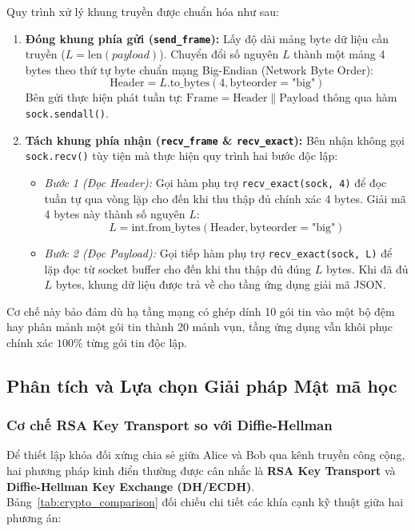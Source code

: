 \documentclass[a4paper,12pt]{article}
\begin{document}
Quy trình xử lý khung truyền được chuẩn hóa như sau:
\begin{enumerate}
    \item \textbf{Đóng khung phía gửi (\texttt{send\_frame}):} Lấy độ dài mảng byte dữ liệu cần truyền ($L = \text{len}(payload)$). Chuyển đổi số nguyên $L$ thành một mảng 4 bytes theo thứ tự byte chuẩn mạng Big-Endian (Network Byte Order):
    \begin{equation}
        \text{Header} = L\text{.to\_bytes}(4, \text{byteorder}=\text{"big"})
    \end{equation}
    Bên gửi thực hiện phát tuần tự: $\text{Frame} = \text{Header} \parallel \text{Payload}$ thông qua hàm \texttt{sock.sendall()}.
    \item \textbf{Tách khung phía nhận (\texttt{recv\_frame} \& \texttt{recv\_exact}):} Bên nhận không gọi \texttt{sock.recv()} tùy tiện mà thực hiện quy trình hai bước độc lập:
    \begin{itemize}
        \item \textit{Bước 1 (Đọc Header):} Gọi hàm phụ trợ \texttt{recv\_exact(sock, 4)} để đọc tuần tự qua vòng lặp cho đến khi thu thập đủ chính xác 4 bytes. Giải mã 4 bytes này thành số nguyên $L$:
        \begin{equation}
            L = \text{int.from\_bytes}(\text{Header}, \text{byteorder}=\text{"big"})
        \end{equation}
        \item \textit{Bước 2 (Đọc Payload):} Gọi tiếp hàm phụ trợ \texttt{recv\_exact(sock, L)} để lặp đọc từ socket buffer cho đến khi thu thập đủ đúng $L$ bytes. Khi đã đủ $L$ bytes, khung dữ liệu được trả về cho tầng ứng dụng giải mã JSON.
    \end{itemize}
\end{enumerate}

Cơ chế này bảo đảm dù hạ tầng mạng có ghép dính 10 gói tin vào một bộ đệm hay phân mảnh một gói tin thành 20 mảnh vụn, tầng ứng dụng vẫn khôi phục chính xác $100\%$ từng gói tin độc lập.

\subsection{Phân tích và Lựa chọn Giải pháp Mật mã học}

\subsubsection{Cơ chế RSA Key Transport so với Diffie-Hellman}
Để thiết lập khóa đối xứng chia sẻ giữa Alice và Bob qua kênh truyền công cộng, hai phương pháp kinh điển thường được cân nhắc là \textbf{RSA Key Transport} và \textbf{Diffie-Hellman Key Exchange (DH/ECDH)}. Bảng~\ref{tab:crypto_comparison} đối chiếu chi tiết các khía cạnh kỹ thuật giữa hai phương án:
\end{document}
